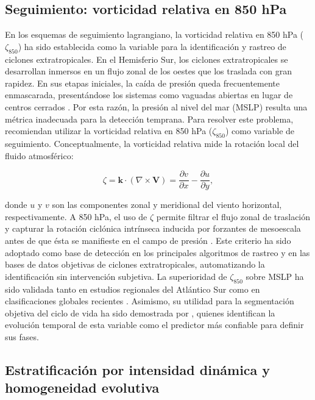 \subsection{Seguimiento: vorticidad relativa en 850 hPa}\label{subsec:tb_zeta}

En los esquemas de seguimiento lagrangiano, la vorticidad relativa en 850 hPa ($\zeta_{850}$) ha sido establecida como la variable  para la identificación y rastreo de ciclones extratropicales. 
En el Hemisferio Sur, los ciclones extratropicales se desarrollan inmersos en un flujo zonal de los oestes que los traslada con gran rapidez. 
En sus etapas iniciales, la caída de presión queda frecuentemente enmascarada, presentándose los sistemas como vaguadas abiertas en lugar de centros cerrados \citep{sinclair1994objective}. 
Por esta razón, la presión al nivel del mar (MSLP) resulta una métrica inadecuada para la detección temprana.
Para resolver este problema, \citet{sinclair1997objective} recomiendan utilizar la vorticidad relativa en 850 hPa ($\zeta_{850}$) como variable de seguimiento. 
Conceptualmente, la vorticidad relativa mide la rotación local del fluido atmosférico:

\begin{equation}\label{eq:vorticidad_relativa}
\zeta = \mathbf{k} \cdot (\nabla \times \mathbf{V}) = \frac{\partial v}{\partial x} - \frac{\partial u}{\partial y},
\end{equation}

\noindent donde $u$ y $v$ son las componentes zonal y meridional del viento horizontal, respectivamente. 
A 850 hPa, el uso de $\zeta$ permite filtrar el flujo zonal de traslación y capturar la rotación ciclónica intrínseca inducida por forzantes de mesoescala antes de que ésta se manifieste en el campo de presión \citep{hoskins2005new}. 
Este criterio ha sido adoptado como base de detección en los principales algoritmos de rastreo y en las bases de datos objetivas de ciclones extratropicales, automatizando la identificación sin intervención subjetiva.
La superioridad de $\zeta_{850}$ sobre MSLP ha sido validada tanto en estudios regionales del Atlántico Sur \citep{gramcianinov2019properties,padilhareinke2024objective} como en clasificaciones globales recientes \citep{corner2025classification}. Asimismo, su utilidad para la segmentación objetiva del ciclo de vida ha sido demostrada por \citet{coutodesouza2024new}, quienes identifican la evolución temporal de esta variable como el predictor más confiable para definir sus fases.

\subsection{Estratificación por intensidad dinámica y homogeneidad evolutiva}\label{subsec:tb_poblaciones}

